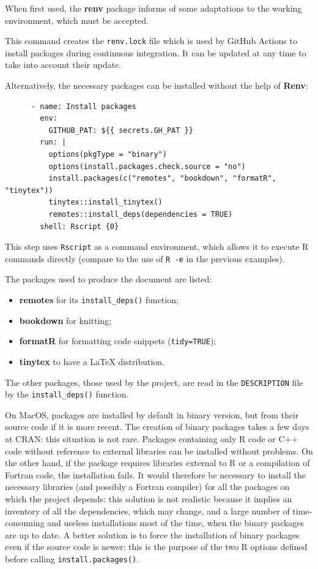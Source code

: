 \documentclass[
  12pt,
  american,
  a4paper,
  extrafontsizes,onecolumn,openright
  ]{memoir}
\providecommand{\tightlist}{%
  \setlength{\itemsep}{0pt}\setlength{\parskip}{0pt}}
\begin{document}
\normalsize

When first used, the \textbf{renv} package informs of some adaptations to the working environment, which must be accepted.

This command creates the \texttt{renv.lock} file which is used by GitHub Actions to install packages during continuous integration.
It can be updated at any time to take into account their update.

Alternatively, the necessary packages can be installed without the help of \textbf{Renv}:

\begin{verbatim}
      - name: Install packages
        env:
          GITHUB_PAT: ${{ secrets.GH_PAT }}
        run: |
          options(pkgType = "binary")
          options(install.packages.check.source = "no")
          install.packages(c("remotes", "bookdown", "formatR", "tinytex"))
          tinytex::install_tinytex()
          remotes::install_deps(dependencies = TRUE)
        shell: Rscript {0}
\end{verbatim}

This step uses \texttt{Rscript} as a command environment, which allows it to execute R commands directly (compare to the use of \texttt{R\ -e} in the previous examples).

The packages used to produce the document are listed:

\begin{itemize}
\tightlist
\item
  \textbf{remotes} for its \texttt{install\_deps()} function;
\item
  \textbf{bookdown} for knitting;
\item
  \textbf{formatR} for formatting code snippets (\texttt{tidy=TRUE});
\item
  \textbf{tinytex} to have a LaTeX distribution.
\end{itemize}

The other packages, those used by the project, are read in the \texttt{DESCRIPTION} file by the \texttt{install\_deps()} function.

On MacOS, packages are installed by default in binary version, but from their source code if it is more recent.
The creation of binary packages takes a few days at CRAN: this situation is not rare.
Packages containing only R code or C++ code without reference to external libraries can be installed without problems.
On the other hand, if the package requires libraries external to R or a compilation of Fortran code, the installation fails.
It would therefore be necessary to install the necessary libraries (and possibly a Fortran compiler) for all the packages on which the project depends: this solution is not realistic because it implies an inventory of all the dependencies, which may change, and a large number of time-consuming and useless installations most of the time, when the binary packages are up to date.
A better solution is to force the installation of binary packages even if the source code is newer: this is the purpose of the two R options defined before calling \texttt{install.packages()}.
\end{document}
